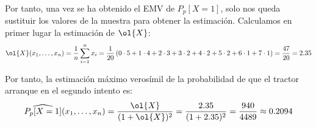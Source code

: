 \begin{ejercicio}
    Por tanto, una vez se ha obtenido el EMV de $P_p[X=1]$, solo nos queda sustituir los valores de la muestra para obtener la estimación. Calculamos en primer lugar la estimación de $\ol{X}$:
    \begin{equation*}
        \ol{X}(x_1, \ldots, x_n) = \frac{1}{n}\sum_{i=1}^{n}x_i = \frac{1}{20}\left(0\cdot 5 + 1\cdot 4 + 2\cdot 3 + 3\cdot 2 + 4\cdot 2 + 5\cdot 2 + 6\cdot 1 + 7\cdot 1\right) = \frac{47}{20} = 2.35
    \end{equation*}

    Por tanto, la estimación máximo verosímil de la probabilidad de que el tractor arranque en el segundo intento es:
    \begin{equation*}
        \widehat{P_p[X=1]}(x_1, \ldots, x_n) = \dfrac{\ol{X}}{(1+\ol{X})^2} = \frac{2.35}{(1+2.35)^2} = \frac{940}{4489} \approx 0.2094
    \end{equation*}
\end{ejercicio}

